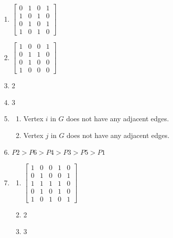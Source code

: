 \documentclass{article}
\begin{document}
\begin{enumerate}
\begin{enumerate}
	      \end{enumerate}
	      \setcounter{enumi}{44}
	\item $\begin{bmatrix}
			      0 & 1 & 0 & 1 \\
			      1 & 0 & 1 & 0 \\
			      0 & 1 & 0 & 1 \\
			      1 & 0 & 1 & 0
		      \end{bmatrix}$
	\item $\begin{bmatrix}
			      1 & 0 & 0 & 1 \\
			      0 & 1 & 1 & 0 \\
			      0 & 1 & 0 & 0 \\
			      1 & 0 & 0 & 0
		      \end{bmatrix}$
	      \setcounter{enumi}{60}
	\item 2
	      \setcounter{enumi}{62}
	\item 3
	      \setcounter{enumi}{68}
	\item \begin{enumerate}
		      \item Vertex $i$ in $G$ does not have any adjacent edges.
		      \item Vertex $j$ in $G$ does not have any adjacent edges.
	      \end{enumerate}
	      \setcounter{enumi}{70}
	\item $P2 > P6 > P4 > P3 > P5 > P1$
	      \setcounter{enumi}{72}
	\item \begin{enumerate}
		      \item $\begin{bmatrix}
				            1 & 0 & 0 & 1 & 0 \\
				            0 & 1 & 0 & 0 & 1 \\
				            1 & 1 & 1 & 1 & 0 \\
				            0 & 1 & 0 & 1 & 0 \\
				            1 & 0 & 1 & 0 & 1
			            \end{bmatrix}$
		      \item 2
		      \item 3
	      \end{enumerate}
\end{enumerate}
\end{document}
